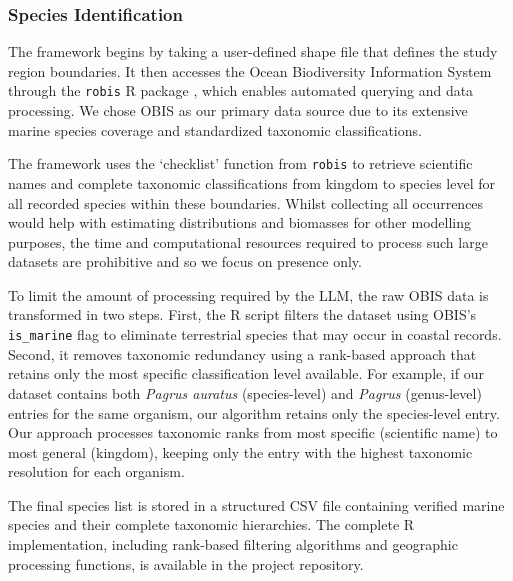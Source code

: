\subsubsection{Species Identification}

The framework begins by taking a user-defined shape file that defines the study region boundaries. It then accesses the Ocean Biodiversity Information System \citep{Grassle1999} through the \texttt{robis} R package \citep{robis}, which enables automated querying and data processing. We chose OBIS as our primary data source due to its extensive marine species coverage and standardized taxonomic classifications. 

The framework uses the `checklist' function from \texttt{robis} to retrieve scientific names and complete taxonomic classifications from kingdom to species level for all recorded species within these boundaries. Whilst collecting all occurrences would help with estimating distributions and biomasses for other modelling purposes, the time and computational resources required to process such large datasets are prohibitive and so we focus on presence only. 

To limit the amount of processing required by the LLM, the raw OBIS data is transformed in two steps. First, the R script filters the dataset using OBIS's \texttt{is\_marine} flag to eliminate terrestrial species that may occur in coastal records. Second, it removes taxonomic redundancy using a rank-based approach that retains only the most specific classification level available. For example, if our dataset contains both \textit{Pagrus auratus} (species-level) and \textit{Pagrus} (genus-level) entries for the same organism, our algorithm retains only the species-level entry. Our approach processes taxonomic ranks from most specific (scientific name) to most general (kingdom), keeping only the entry with the highest taxonomic resolution for each organism. 

The final species list is stored in a structured CSV file containing verified marine species and their complete taxonomic hierarchies. The complete R implementation, including rank-based filtering algorithms and geographic processing functions, is available in the project repository.
